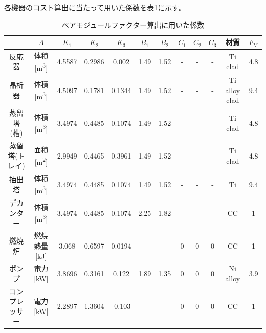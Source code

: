 \documentclass[a4j]{jsreport}
\begin{document}
各機器のコスト算出に当たって用いた係数を表\ref{BM係数}に示す。
\begin{table}[h]
    \caption{ベアモジュールファクター算出に用いた係数}
    \label{BM係数}
    \begin{tabular}{cccccccccccc}\hline
    &$A$ & $K_1$     & $K_2$     & $K_3$     & $B_1$   & $B_2$   &$C_1$&$C_2$&$C_3$& 材質 & $F_\mathrm{M}$  \\\hline
    反応器  & 体積[\si{\cubic\metre}]  & 4.5587 & 0.2986 & 0.002  & 1.49 & 1.52 &-&-&-& Ti clad       & 4.8 \\
    晶析器   & 体積[\si{\cubic\metre}] & 4.5097 & 0.1781 & 0.1344 & 1.49 & 1.52 &-&-&-& Ti alloy clad & 9.4 \\
    蒸留塔(槽)&  体積[\si{\cubic\metre}]   & 3.4974 & 0.4485 & 0.1074 & 1.49 & 1.52 &-&-&-& Ti clad    & 4.8 \\
    蒸留塔(トレイ)& 面積[\si{\square\metre}] & 2.9949 & 0.4465 & 0.3961 & 1.49 & 1.52 &-&-&-& Ti clad   & 4.8 \\
    抽出塔   & 体積[\si{\cubic\metre}] & 3.4974 & 0.4485 & 0.1074 & 1.49 & 1.52 &-&-&-& Ti            & 9.4 \\
    デカンター&  体積[\si{\cubic\metre}] & 3.4974 & 0.4485 & 0.1074 & 2.25 & 1.82 &-&-&-& CC            & 1   \\
    燃焼炉   & 燃焼熱量[\si{\kilo \joule}] & 3.068  & 0.6597 & 0.0194 & -    & -    &0&0&0& CC             & 1   \\
    ポンプ   & 電力[\si{\kilo\watt}] & 3.8696 & 0.3161 & 0.122  & 1.89 & 1.35 &0&0&0& Ni alloy      & 3.9 \\
    コンプレッサー& 電力[\si{\kilo\watt}] & 2.2897 & 1.3604 & -0.103 & -    & -    &0&0&0& CC            & 1  \\\hline
    \end{tabular}
\end{table}
\end{document}
